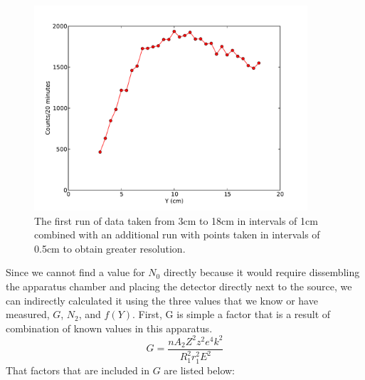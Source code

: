 \begin{figure}[H]
\begin{center}
\includegraphics[width=4in]{secondrun.pdf}
\caption{The first run of data taken from 3cm to 18cm in intervals of 1cm combined  with an additional run with points taken in intervals of 0.5cm to obtain greater resolution.}
\end{center}
\end{figure}

Since we cannot find a value for $N_0$ directly because it would require dissembling the apparatus chamber and placing the detector directly next to the source, we can indirectly calculated it using the three values that we know or have measured, $G$, $N_2$, and $f(Y)$. First, G is simple a factor that is a result of combination of known values in this apparatus. 
\begin{equation}G=\frac{nA_2Z^2z^2e^4k^2}{R_1^2r_1^2  E^2}\end{equation}
That factors that are included in $G$ are listed below:

